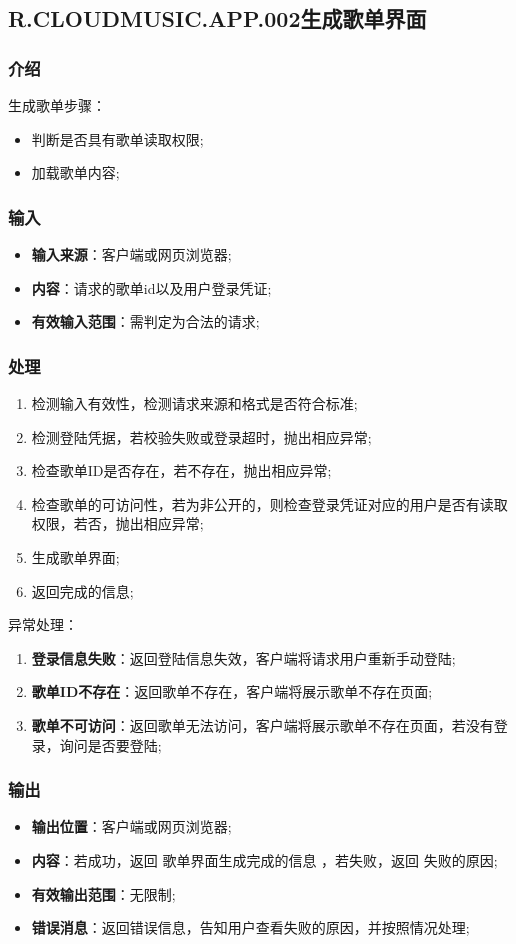 \subsection{R.CLOUDMUSIC.APP.002生成歌单界面}
\subsubsection{介绍}
生成歌单步骤：
	\begin{itemize}
		\item 判断是否具有歌单读取权限;
		\item 加载歌单内容;
	\end{itemize}
\subsubsection{输入}
	\begin{itemize}
		\item \textbf{输入来源}：客户端或网页浏览器;
		\item \textbf{内容}：请求的歌单id以及用户登录凭证;
		\item \textbf{有效输入范围}：需判定为合法的请求;
	\end{itemize}
\subsubsection{处理}
	\begin{enumerate}
		\item 检测输入有效性，检测请求来源和格式是否符合标准;
		\item 检测登陆凭据，若校验失败或登录超时，抛出相应异常;
		\item 检查歌单ID是否存在，若不存在，抛出相应异常;
		\item 检查歌单的可访问性，若为非公开的，则检查登录凭证对应的用户是否有读取权限，若否，抛出相应异常;
		\item 生成歌单界面;
		\item 返回完成的信息;
	\end{enumerate}
	\noindent 异常处理：
	\begin{enumerate}
		\item \textbf{登录信息失败}：返回登陆信息失效，客户端将请求用户重新手动登陆;
		\item \textbf{歌单ID不存在}：返回歌单不存在，客户端将展示歌单不存在页面;
		\item \textbf{歌单不可访问}：返回歌单无法访问，客户端将展示歌单不存在页面，若没有登录，询问是否要登陆;
	\end{enumerate}
\subsubsection{输出}
\begin{itemize}
	\item \textbf{输出位置}：客户端或网页浏览器;
	\item \textbf{内容}：若成功，返回 歌单界面生成完成的信息 ，若失败，返回 失败的原因;
	\item \textbf{有效输出范围}：无限制;
	\item \textbf{错误消息}：返回错误信息，告知用户查看失败的原因，并按照情况处理;
\end{itemize}

